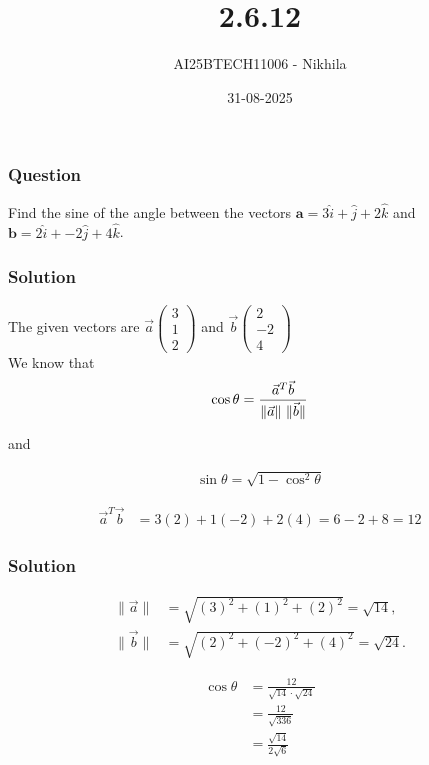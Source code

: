 \documentclass{beamer}
\title{2.6.12 }
\author{AI25BTECH11006 - Nikhila}
\date{31-08-2025}
\begin{document}
\frame{\titlepage}

\begin{frame}
\frametitle{Question}
Find the sine of the angle between the vectors $\textbf{a} = 3\hat{i} + \hat{j} + 2\hat{k}$ and $\textbf{b} = 2\hat{i} + -2\hat{j} + 4\hat{k}$.\\
 \end{frame}




\begin{frame}
\frametitle{Solution}
The given vectors are $\vec{a}\begin{pmatrix}3 \\ 1 \\ 2\end{pmatrix} $ and $  \vec{b}\begin{pmatrix}2 \\ -2 \\ 4\end{pmatrix}$ \\ 

We know that
\begin{align}
\cos\theta = \frac{\vec{a}^T \vec{b}}{\lVert \vec{a} \rVert \hspace{0.3em} \lVert \vec{b} \rVert}
\end{align}

and

\begin{align}
\sin\theta = \sqrt{1 - \cos^2\theta}
\end{align}

\begin{align}
\vec{a}^T \vec{b} &= 3(2) + 1(-2) + 2(4) = 6 - 2 + 8 = 12
\end{align}

\end{frame}


\begin{frame}
\frametitle{Solution}

\begin{align}
\lVert \vec{a} \rVert &= \sqrt{(3)^2 + (1)^2 + (2)^2} = \sqrt{14}, \\
\lVert \vec{b} \rVert &= \sqrt{(2)^2 + (-2)^2 + (4)^2} = \sqrt{24}.
\end{align}

\begin{align}
\cos\theta &= \frac{12}{\sqrt{14} \cdot \sqrt{24}} \\
&= \frac{12}{\sqrt{336}} \\
&= \frac{\sqrt{14}}{2\sqrt{6}}
\end{align}

\end{frame}
\end{document}
